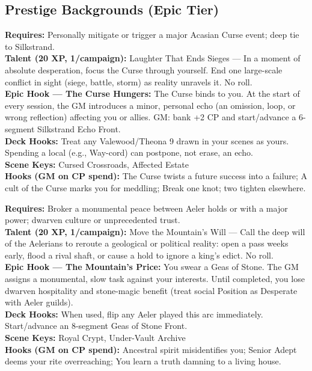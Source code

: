 \documentclass[12pt]{article}
\begin{document}
\subsection*{Prestige Backgrounds (Epic Tier)}

\begin{description}[leftmargin=*]
  
  \item[\textbf{The Cursed Child of Silkstrand}] 
  \textbf{Requires:} Personally mitigate or trigger a major Acasian Curse event; deep tie to Silkstrand. \\
  \textbf{Talent (20 XP, 1/campaign):} Laughter That Ends Sieges — In a moment of absolute desperation, focus the Curse through yourself. End one large-scale conflict in sight (siege, battle, storm) as reality unravels it. No roll. \\
  \textbf{Epic Hook — The Curse Hungers:} The Curse binds to you. At the start of every session, the GM introduces a minor, personal echo (an omission, loop, or wrong reflection) affecting you or allies. GM: bank +2 CP and start/advance a 6-segment Silkstrand Echo Front. \\
  \textbf{Deck Hooks:} Treat any Valewood/Theona 9 drawn in your scenes as yours. Spending a local (e.g., Way-cord) can postpone, not erase, an echo. \\
  \textbf{Scene Keys:} Cursed Crossroads, Affected Estate \\
  \textbf{Hooks (GM on CP spend):} The Curse twists a future success into a failure; A cult of the Curse marks you for meddling; Break one knot; two tighten elsewhere.

  \item[\textbf{Stone-Speaker of Khaz-Vurim}] 
  \textbf{Requires:} Broker a monumental peace between Aeler holds or with a major power; dwarven culture or unprecedented trust. \\
  \textbf{Talent (20 XP, 1/campaign):} Move the Mountain's Will — Call the deep will of the Aelerians to reroute a geological or political reality: open a pass weeks early, flood a rival shaft, or cause a hold to ignore a king's edict. No roll. \\
  \textbf{Epic Hook — The Mountain's Price:} You swear a Geas of Stone. The GM assigns a monumental, slow task against your interests. Until completed, you lose dwarven hospitality and stone-magic benefit (treat social Position as Desperate with Aeler guilds). \\
  \textbf{Deck Hooks:} When used, flip any Aeler played this arc immediately. Start/advance an 8-segment Geas of Stone Front. \\
  \textbf{Scene Keys:} Royal Crypt, Under-Vault Archive \\
  \textbf{Hooks (GM on CP spend):} Ancestral spirit misidentifies you; Senior Adept deems your rite overreaching; You learn a truth damning to a living house.


\end{description}
\end{document}

